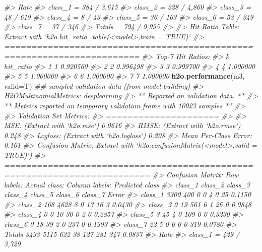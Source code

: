 \documentclass[]{book}
\newenvironment{Shaded}{\begin{snugshade}}{\end{snugshade}}
\newcommand{\CommentTok}[1]{\textcolor[rgb]{0.56,0.35,0.01}{\textit{#1}}}
\newcommand{\DataTypeTok}[1]{\textcolor[rgb]{0.13,0.29,0.53}{#1}}
\newcommand{\KeywordTok}[1]{\textcolor[rgb]{0.13,0.29,0.53}{\textbf{#1}}}
\newcommand{\NormalTok}[1]{#1}
\begin{document}
\begin{Shaded}
\begin{Highlighting}[]
\CommentTok{#>                  Rate}
\CommentTok{#> class_1 = 384 / 3,615}
\CommentTok{#> class_2 = 228 / 4,860}
\CommentTok{#> class_3 =    48 / 619}
\CommentTok{#> class_4 =      8 / 43}
\CommentTok{#> class_5 =    36 / 163}
\CommentTok{#> class_6 =    53 / 349}
\CommentTok{#> class_7 =    37 / 346}
\CommentTok{#> Totals  = 794 / 9,995}
\CommentTok{#> }
\CommentTok{#> Hit Ratio Table: Extract with `h2o.hit_ratio_table(<model>,train = TRUE)`}
\CommentTok{#> =======================================================================}
\CommentTok{#> Top-7 Hit Ratios: }
\CommentTok{#>   k hit_ratio}
\CommentTok{#> 1 1  0.920560}
\CommentTok{#> 2 2  0.996498}
\CommentTok{#> 3 3  0.999700}
\CommentTok{#> 4 4  1.000000}
\CommentTok{#> 5 5  1.000000}
\CommentTok{#> 6 6  1.000000}
\CommentTok{#> 7 7  1.000000}
\KeywordTok{h2o.performance}\NormalTok{(m3, }\DataTypeTok{valid=}\NormalTok{T)          }\CommentTok{## sampled validation data (from model building)}
\CommentTok{#> H2OMultinomialMetrics: deeplearning}
\CommentTok{#> ** Reported on validation data. **}
\CommentTok{#> ** Metrics reported on temporary validation frame with 10023 samples **}
\CommentTok{#> }
\CommentTok{#> Validation Set Metrics: }
\CommentTok{#> =====================}
\CommentTok{#> }
\CommentTok{#> MSE: (Extract with `h2o.mse`) 0.0616}
\CommentTok{#> RMSE: (Extract with `h2o.rmse`) 0.248}
\CommentTok{#> Logloss: (Extract with `h2o.logloss`) 0.208}
\CommentTok{#> Mean Per-Class Error: 0.161}
\CommentTok{#> Confusion Matrix: Extract with `h2o.confusionMatrix(<model>,valid = TRUE)`)}
\CommentTok{#> =========================================================================}
\CommentTok{#> Confusion Matrix: Row labels: Actual class; Column labels: Predicted class}
\CommentTok{#>         class_1 class_2 class_3 class_4 class_5 class_6 class_7  Error}
\CommentTok{#> class_1    3300     400       0       0       4       0      25 0.1150}
\CommentTok{#> class_2     168    4628       8       0      13      16       3 0.0430}
\CommentTok{#> class_3       0      19     561       6       1      26       0 0.0848}
\CommentTok{#> class_4       0       0      10      30       0       2       0 0.2857}
\CommentTok{#> class_5       3      45       4       0     109       0       0 0.3230}
\CommentTok{#> class_6       0      18      39       2       0     237       0 0.1993}
\CommentTok{#> class_7      22       5       0       0       0       0     319 0.0780}
\CommentTok{#> Totals     3493    5115     622      38     127     281     347 0.0837}
\CommentTok{#>                   Rate}
\CommentTok{#> class_1 =  429 / 3,729}

\end{Highlighting}
\end{Shaded}
\end{document}
